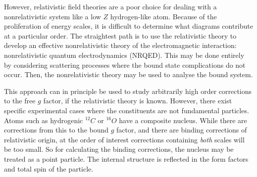 However, relativistic field theories are a poor choice for dealing with a nonrelativistic system like a low $Z$ hydrogen-like atom.  Because of the proliferation of energy scales, it is difficult to determine what diagrams contribute at a particular order.  The straightest path is to use the relativistic theory to develop an effective nonrelativistic theory of the electromagnetic interaction: nonrelativistic quantum electrodynamics (NRQED).  This may be done entirely by considering scattering processes where the bound state complications do not occur.  Then, the nonrelativistic theory may be used to analyse the bound system.


This approach can in principle be used to study arbitrarily high order corrections to the free $g$ factor, if the relativistic theory is known.  However, there exist specific experimental cases where the constituents are not fundamental particles.  Atoms such as hydrogenic $^{12}C$ or $^{16}O$ have a composite nucleus.  While there are corrections from this to the bound $g$ factor, and there are binding corrections of relativistic origin, at the order of interest corrections containing \emph{both} scales will be too small.  So for calculating the binding corrections, the nucleus may be treated as a point particle.  The internal structure is reflected in the form factors and total spin of the particle.


